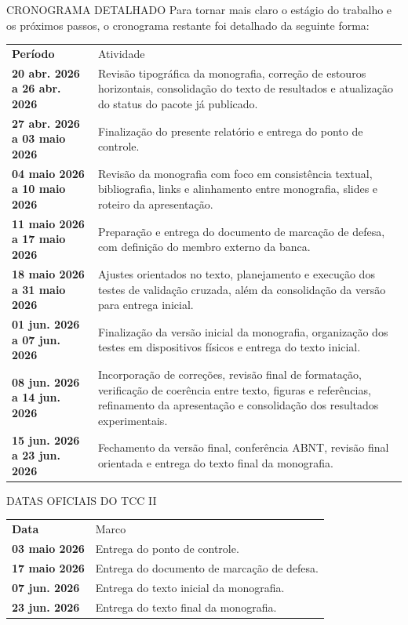 \documentclass[12pt,a4paper]{article}
\begin{document}
\begin{sectionbox}{CRONOGRAMA DETALHADO}
\noindent
Para tornar mais claro o estágio do trabalho e os próximos passos, o cronograma restante foi detalhado da seguinte forma:

\vspace{0.3cm}

\renewcommand{\arraystretch}{1.25}
\begin{tabularx}{\textwidth}{>{\bfseries}p{4.2cm} X}
Período & Atividade \\
20 abr. 2026 a 26 abr. 2026 & Revisão tipográfica da monografia, correção de estouros horizontais, consolidação do texto de resultados e atualização do status do pacote já publicado. \\
27 abr. 2026 a 03 maio 2026 & Finalização do presente relatório e entrega do ponto de controle. \\
04 maio 2026 a 10 maio 2026 & Revisão da monografia com foco em consistência textual, bibliografia, links e alinhamento entre monografia, slides e roteiro da apresentação. \\
11 maio 2026 a 17 maio 2026 & Preparação e entrega do documento de marcação de defesa, com definição do membro externo da banca. \\
18 maio 2026 a 31 maio 2026 & Ajustes orientados no texto, planejamento e execução dos testes de validação cruzada, além da consolidação da versão para entrega inicial. \\
01 jun. 2026 a 07 jun. 2026 & Finalização da versão inicial da monografia, organização dos testes em dispositivos físicos e entrega do texto inicial. \\
08 jun. 2026 a 14 jun. 2026 & Incorporação de correções, revisão final de formatação, verificação de coerência entre texto, figuras e referências, refinamento da apresentação e consolidação dos resultados experimentais. \\
15 jun. 2026 a 23 jun. 2026 & Fechamento da versão final, conferência ABNT, revisão final orientada e entrega do texto final da monografia. \\
\end{tabularx}
\end{sectionbox}

\begin{sectionbox}{DATAS OFICIAIS DO TCC II}
\renewcommand{\arraystretch}{1.25}
\begin{tabularx}{\textwidth}{>{\bfseries}p{4cm} X}
Data & Marco \\
03 maio 2026 & Entrega do ponto de controle. \\
17 maio 2026 & Entrega do documento de marcação de defesa. \\
07 jun. 2026 & Entrega do texto inicial da monografia. \\
23 jun. 2026 & Entrega do texto final da monografia. \\
\end{tabularx}
\end{sectionbox}
\end{document}
